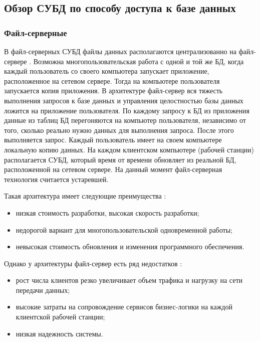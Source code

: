 \subsection{Обзор СУБД по способу доступа к базе данных}
\subsubsection{Файл-серверные}
В файл-серверных СУБД файлы данных располагаются централизованно на файл-сервере \cite{adreyev}. Возможна многопользовательская работа с одной и той же БД, когда каждый пользователь со своего компьютера запускает приложение, расположенное на сетевом сервере. 
Тогда на компьютере пользователя запускается копия приложения. В архитектуре файл-сервер вся тяжесть выполнения запросов к базе данных и управления целостностью базы данных ложится на приложение пользователя.
По каждому запросу к БД из приложения данные из таблиц БД
перегоняются на компьютер пользователя, независимо от того, сколько реально нужно данных для
выполнения запроса. После этого выполняется запрос. Каждый пользователь имеет на своем компьютере
локальную копию данных.
На каждом клиентском компьютере (рабочей станции) располагается СУБД, который время от времени обновляет из реальной БД, расположенной на сетевом сервере.
На данный момент файл-серверная технология считается устаревшей.

Такая архитектура имеет следующие преимущества \cite{classichoose}:
\begin{itemize}
	\item низкая стоимость разработки, высокая скорость разработки;
	\item недорогой вариант для многопользовательской одновременной работы;
	\item невысокая стоимость обновления и изменения программного обеспечения.
\end{itemize}

Однако у архитектуры файл-сервер есть ряд недостатков \cite{classichoose}:
\begin{itemize}
	\item рост числа клиентов резко увеличивает объем трафика и нагрузку на сети
	передачи данных;
	\item высокие затраты на сопровождение сервисов бизнес-логики на каждой
	клиентской рабочей станции;
	\item низкая надежность системы.
\end{itemize}

